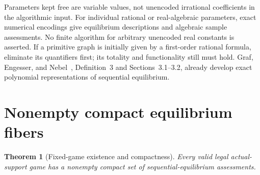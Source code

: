 \documentclass[11pt,a4paper]{article}
\numberwithin{equation}{section}
\newtheorem{theorem}{Theorem}
\theoremstyle{definition}
\begin{document}
Parameters kept free are variable values, not unencoded irrational
coefficients in the algorithmic input.
For individual rational or real-algebraic parameters, exact numerical
encodings give equilibrium descriptions and algebraic sample
assessments. No finite algorithm for arbitrary unencoded real constants
is asserted.
If a primitive graph is initially given by a first-order rational
formula, eliminate its quantifiers first; its totality and functionality
still must hold.
Graf, Engesser, and Nebel~\cite{GEN2024}, Definition~3 and
Sections~3.1--3.2, already develop exact polynomial representations
of sequential equilibrium.

\section{Nonempty compact equilibrium fibers}\label{sec:existence}
\begin{theorem}[Fixed-game existence and compactness]\label{thm:fibers}
Every valid legal actual-support game has a nonempty compact set of
sequential-equilibrium assessments.
\end{theorem}
\end{document}
